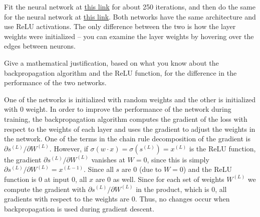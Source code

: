 Fit the neural network at \href{http://playground.tensorflow.org/#activation=relu&batchSize=10&dataset=circle&regDataset=reg-plane&learningRate=0.03&regularizationRate=0&noise=0&networkShape=4,2&seed=0.65409&showTestData=false&discretize=false&percTrainData=50&x=true&y=true&xTimesY=false&xSquared=false&ySquared=false&cosX=false&sinX=false&cosY=false&sinY=false&collectStats=false&problem=classification&initZero=false&hideText=false}{this link} for about 250 iterations, and then do the same for the neural network at  \href{http://playground.tensorflow.org//\#activation=relu&batchSize=10&dataset=circle&regDataset=reg-plane&learningRate=0.03&regularizationRate=0&noise=0&networkShape=4,2&seed=0.6&showTestData=false&discretize=false&percTrainData=50&x=true&y=true&xTimesY=false&xSquared=false&ySquared=false&cosX=false&sinX=false&cosY=false&sinY=false&collectStats=false&problem=classification&initZero=true&hideText=false}{this link}.  Both networks have the same architecture and use ReLU activations.  The only difference between the two is how the layer weights were initialized -- you can examine the layer weights by hovering over the edges between neurons.

Give a mathematical justification, based on what you know about the backpropagation algorithm and the ReLU function, for the difference in the performance of the two networks.

\begin{solution}
    One of the networks is initialized with random weights and the other is initialized with 0 weight. In order to improve the performance of the network during training, the backpropagation algorithm computes the gradient of the loss with respect to the weights of each layer and uses the gradient to adjust the weights in the network. One of the terms in the chain rule decomposition of the gradient is $\partial s^{(L)} / \partial W^{(L)}$. However, if $\sigma(w \cdot x) = \sigma(s^{(L)}) = x^{(L)}$ is the ReLU function, the gradient $\partial s^{(L)} / \partial W^{(L)}$ vanishes at $W = 0$, since this is simply $\partial s^{(L)} / \partial W^{(L)} = x^{(L-1)}$. Since all $s$ are 0 (due to $W = 0$) and the ReLU function is 0 at input 0, all $x$ are 0 as well. Since for each set of weights $W^{(L)}$ we compute the gradient with $\partial s^{(L)} / \partial W^{(L)}$ in the product, which is 0, all gradients with respect to the weights are 0. Thus, no changes occur when backpropagation is used during gradient descent.
\end{solution}

